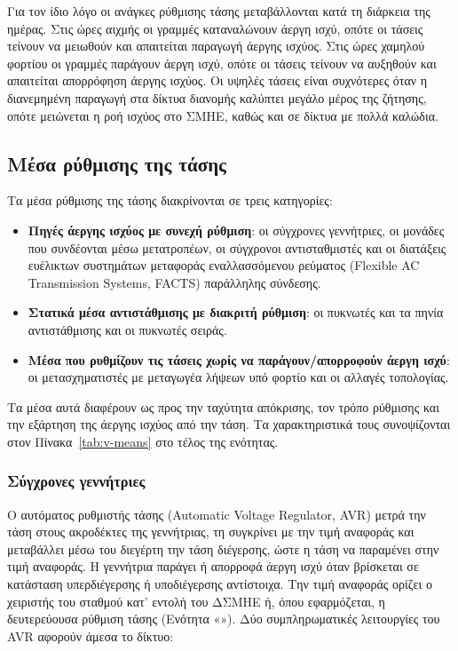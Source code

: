 Για τον ίδιο λόγο οι ανάγκες ρύθμισης τάσης μεταβάλλονται κατά τη διάρκεια της ημέρας. Στις
ώρες αιχμής οι γραμμές καταναλώνουν άεργη ισχύ, οπότε οι τάσεις τείνουν να μειωθούν και
απαιτείται παραγωγή άεργης ισχύος. Στις ώρες χαμηλού φορτίου οι γραμμές παράγουν άεργη ισχύ,
οπότε οι τάσεις τείνουν να αυξηθούν και απαιτείται απορρόφηση άεργης ισχύος. Οι υψηλές τάσεις
είναι συχνότερες όταν η διανεμημένη παραγωγή στα δίκτυα διανομής καλύπτει μεγάλο μέρος της
ζήτησης, οπότε μειώνεται η ροή ισχύος στο ΣΜΗΕ, καθώς και σε δίκτυα με πολλά καλώδια.

\subsection{Μέσα ρύθμισης της τάσης}
\label{sec:q-sources}

Τα μέσα ρύθμισης της τάσης διακρίνονται σε τρεις κατηγορίες:

\begin{itemize}
\item \textbf{Πηγές άεργης ισχύος με συνεχή ρύθμιση}: οι σύγχρονες γεννήτριες, οι μονάδες που
      συνδέονται μέσω μετατροπέων, οι σύγχρονοι αντισταθμιστές και οι διατάξεις ευέλικτων
      συστημάτων μεταφοράς εναλλασσόμενου ρεύματος (Flexible AC Transmission Systems, FACTS)
      παράλληλης σύνδεσης.
\item \textbf{Στατικά μέσα αντιστάθμισης με διακριτή ρύθμιση}: οι πυκνωτές και τα πηνία
      αντιστάθμισης και οι πυκνωτές σειράς.
\item \textbf{Μέσα που ρυθμίζουν τις τάσεις χωρίς να παράγουν/απορροφούν άεργη ισχύ}: οι
      μετασχηματιστές με μεταγωγέα λήψεων υπό φορτίο και οι αλλαγές τοπολογίας.
\end{itemize}

Τα μέσα αυτά διαφέρουν ως προς την ταχύτητα απόκρισης, τον τρόπο ρύθμισης και την εξάρτηση
της άεργης ισχύος από την τάση. Τα χαρακτηριστικά τους συνοψίζονται στον
Πίνακα~\ref{tab:v-means} στο τέλος της ενότητας.

\subsubsection{Σύγχρονες γεννήτριες}
\label{sec:sg}

Ο αυτόματος ρυθμιστής τάσης (Automatic Voltage Regulator, AVR) μετρά την τάση στους
ακροδέκτες της γεννήτριας, τη συγκρίνει με την τιμή αναφοράς και μεταβάλλει μέσω του διεγέρτη
την τάση διέγερσης, ώστε η τάση να παραμένει στην τιμή αναφοράς. Η γεννήτρια παράγει ή
απορροφά άεργη ισχύ όταν βρίσκεται σε κατάσταση υπερδιέγερσης ή υποδιέγερσης αντίστοιχα.
Την τιμή αναφοράς ορίζει ο χειριστής του σταθμού κατ' εντολή του ΔΣΜΗΕ ή, όπου
εφαρμόζεται, η δευτερεύουσα
ρύθμιση τάσης (Ενότητα «»). Δύο συμπληρωματικές λειτουργίες του AVR
αφορούν άμεσα το δίκτυο:

